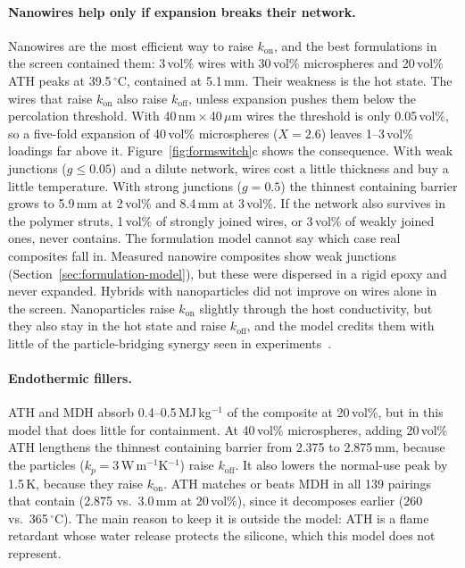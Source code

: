 \documentclass[11pt]{article}
\newcommand{\kon}{k_\mathrm{on}}
\newcommand{\koff}{k_\mathrm{off}}
\begin{document}
\paragraph{Nanowires help only if expansion breaks their network.} Nanowires are the most
efficient way to raise $\kon$, and the best formulations in the screen contained them:
3\,vol\% wires with 30\,vol\% microspheres and 20\,vol\% ATH peaks at 39.5\,$^\circ$C,
contained at 5.1\,mm. Their weakness is the hot state. The wires that raise $\kon$ also
raise $\koff$, unless expansion pushes them below the percolation threshold. With
40\,nm\,$\times$\,40\,$\mu$m wires the threshold is only 0.05\,vol\%, so a five-fold
expansion of 40\,vol\% microspheres ($X = 2.6$) leaves 1--3\,vol\% loadings far above it.
Figure~\ref{fig:formswitch}c shows the consequence. With weak junctions ($g \le 0.05$)
and a dilute network, wires cost a little thickness and buy a little temperature. With
strong junctions ($g = 0.5$) the thinnest containing barrier grows to 5.9\,mm at
2\,vol\% and 8.4\,mm at 3\,vol\%. If the network also survives in the polymer struts,
1\,vol\% of strongly joined wires, or 3\,vol\% of weakly joined ones, never contains. The formulation model
cannot say which case real composites fall in. Measured nanowire composites show weak
junctions (Section~\ref{sec:formulation-model}), but these were dispersed in a rigid
epoxy and never expanded. Hybrids with nanoparticles did not improve on wires alone in
the screen. Nanoparticles raise $\kon$ slightly through the host conductivity, but they
also stay in the hot state and raise $\koff$, and the model credits them with little of
the particle-bridging synergy seen in experiments~\cite{hu2021agnwal2o3}.

\paragraph{Endothermic fillers.} ATH and MDH absorb 0.4--0.5\,MJ\,kg$^{-1}$ of the
composite at 20\,vol\%, but in this model that does little for containment. At 40\,vol\%
microspheres, adding 20\,vol\% ATH lengthens the thinnest containing barrier from 2.375
to 2.875\,mm, because the particles ($k_p = 3$\,W\,m$^{-1}$K$^{-1}$) raise $\koff$. It also
lowers the normal-use peak by 1.5\,K, because they raise $\kon$. ATH matches or beats MDH in
all 139 pairings that contain (2.875 vs.\ 3.0\,mm at 20\,vol\%), since it decomposes earlier
(260 vs.\ 365\,$^\circ$C). The main reason to keep it is outside the model: ATH is a
flame retardant whose water release protects the silicone, which this model does not
represent.
\end{document}
